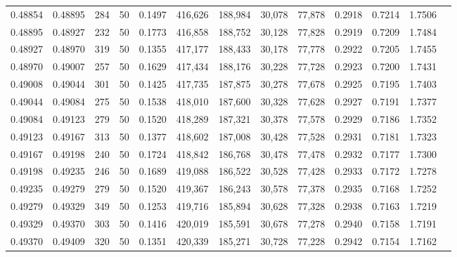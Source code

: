 \begin{tabular}{rrrrrrrrrrrrr}
0.48854 & 0.48895 &   284 &  50 &                                     0.1497 & 416,626 & 188,984 &  30,078 &  77,878 & 0.2918 & 0.7214 & 1.7506 \\
0.48895 & 0.48927 &   232 &  50 &                                     0.1773 & 416,858 & 188,752 &  30,128 &  77,828 & 0.2919 & 0.7209 & 1.7484 \\
0.48927 & 0.48970 &   319 &  50 &                                     0.1355 & 417,177 & 188,433 &  30,178 &  77,778 & 0.2922 & 0.7205 & 1.7455 \\
0.48970 & 0.49007 &   257 &  50 &                                     0.1629 & 417,434 & 188,176 &  30,228 &  77,728 & 0.2923 & 0.7200 & 1.7431 \\
0.49008 & 0.49044 &   301 &  50 &                                     0.1425 & 417,735 & 187,875 &  30,278 &  77,678 & 0.2925 & 0.7195 & 1.7403 \\
0.49044 & 0.49084 &   275 &  50 &                                     0.1538 & 418,010 & 187,600 &  30,328 &  77,628 & 0.2927 & 0.7191 & 1.7377 \\
0.49084 & 0.49123 &   279 &  50 &                                     0.1520 & 418,289 & 187,321 &  30,378 &  77,578 & 0.2929 & 0.7186 & 1.7352 \\
0.49123 & 0.49167 &   313 &  50 &                                     0.1377 & 418,602 & 187,008 &  30,428 &  77,528 & 0.2931 & 0.7181 & 1.7323 \\
0.49167 & 0.49198 &   240 &  50 &                                     0.1724 & 418,842 & 186,768 &  30,478 &  77,478 & 0.2932 & 0.7177 & 1.7300 \\
0.49198 & 0.49235 &   246 &  50 &                                     0.1689 & 419,088 & 186,522 &  30,528 &  77,428 & 0.2933 & 0.7172 & 1.7278 \\
0.49235 & 0.49279 &   279 &  50 &                                     0.1520 & 419,367 & 186,243 &  30,578 &  77,378 & 0.2935 & 0.7168 & 1.7252 \\
0.49279 & 0.49329 &   349 &  50 &                                     0.1253 & 419,716 & 185,894 &  30,628 &  77,328 & 0.2938 & 0.7163 & 1.7219 \\
0.49329 & 0.49370 &   303 &  50 &                                     0.1416 & 420,019 & 185,591 &  30,678 &  77,278 & 0.2940 & 0.7158 & 1.7191 \\
0.49370 & 0.49409 &   320 &  50 &                                     0.1351 & 420,339 & 185,271 &  30,728 &  77,228 & 0.2942 & 0.7154 & 1.7162 \\

\end{tabular}
